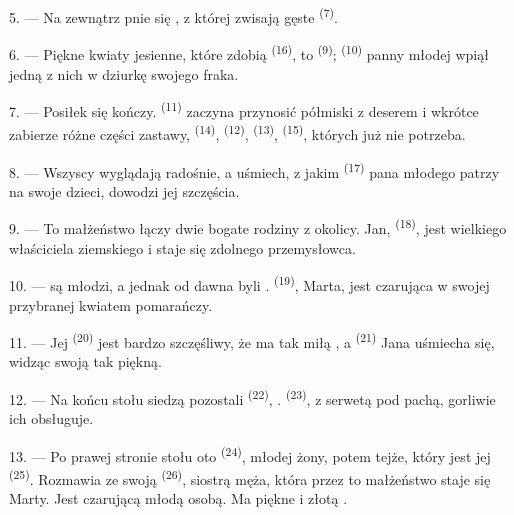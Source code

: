 5. --- Na zewnątrz  pnie się , z której zwisają gęste
 \textsuperscript{(7)}.

6. --- Piękne kwiaty jesienne, które zdobią  \textsuperscript{(16)}, to
 \textsuperscript{(9)};  \textsuperscript{(10)} panny
młodej wpiął jedną z nich w dziurkę swojego fraka.

7. --- Posiłek się kończy.  \textsuperscript{(11)} zaczyna przynosić
półmiski z deserem i wkrótce zabierze różne części zastawy, 
\textsuperscript{(14)},  \textsuperscript{(12)}, 
\textsuperscript{(13)},  \textsuperscript{(15)}, których już nie
potrzeba.

\VUsaut{3.0mm}

8. --- Wszyscy wyglądają radośnie, a uśmiech, z jakim 
\textsuperscript{(17)} pana młodego patrzy na swoje dzieci, dowodzi jej szczęścia.

9. --- To małżeństwo łączy dwie bogate rodziny z okolicy. Jan, 
\textsuperscript{(18)}, jest  wielkiego właściciela ziemskiego i staje się
 zdolnego przemysłowca.

10. ---  są młodzi, a jednak od dawna byli .
 \textsuperscript{(19)}, Marta, jest czarująca w swojej
 przybranej kwiatem pomarańczy.

11. --- Jej  \textsuperscript{(20)} jest bardzo szczęśliwy, że ma tak miłą
, a  \textsuperscript{(21)} Jana uśmiecha się, widząc
swoją  tak piękną.

12. --- Na końcu stołu siedzą pozostali  \textsuperscript{(22)},
. 
\textsuperscript{(23)}, z serwetą pod pachą, gorliwie ich obsługuje.

\VUsaut{3.0mm}

13. --- Po prawej stronie stołu oto  \textsuperscript{(24)},
 młodej żony, potem  tejże, który jest jej
 \textsuperscript{(25)}. Rozmawia ze swoją 
\textsuperscript{(26)}, siostrą męża, która przez to małżeństwo staje się
 Marty. Jest czarującą młodą osobą. Ma piękne  i złotą .

